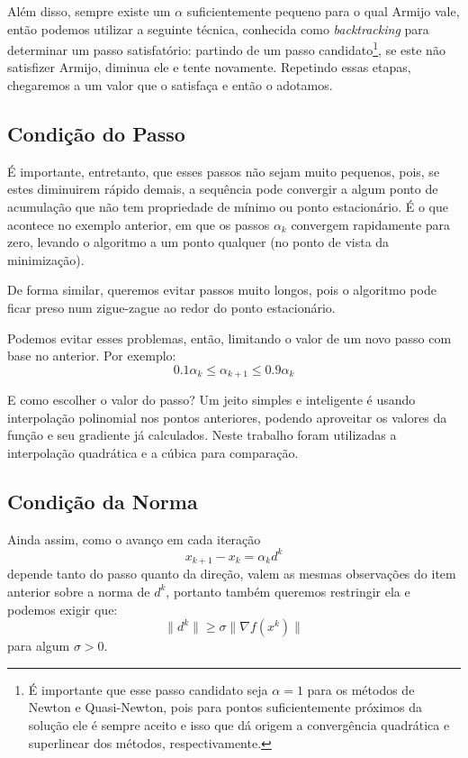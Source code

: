 \documentclass[a4paper,11pt]{article}
\begin{document}
            Além disso, sempre existe um $\alpha$ suficientemente pequeno para o qual Armijo vale, então podemos utilizar
            a seguinte técnica, conhecida como \emph{backtracking} para determinar um passo satisfatório: partindo de um
            passo candidato\footnote{É importante que esse passo candidato seja $\alpha = 1$ para os métodos de Newton e Quasi-Newton, pois para pontos suficientemente próximos da solução ele é sempre aceito e isso que dá origem a convergência quadrática e superlinear dos métodos, respectivamente.}, se este não satisfizer Armijo, diminua ele e tente novamente. Repetindo essas etapas, chegaremos a
            um valor que o satisfaça e então o adotamos.

        \subsection*{Condição do Passo}
            É importante, entretanto, que esses passos não sejam muito pequenos, pois, se estes diminuirem rápido demais, a sequência pode
            convergir a algum ponto de acumulação que não tem propriedade de mínimo ou ponto estacionário. É o que acontece
            no exemplo anterior, em que os passos $\alpha_k$ convergem rapidamente para zero, levando o algoritmo a um ponto
            qualquer (no ponto de vista da minimização).

            De forma similar, queremos evitar passos muito longos, pois o algoritmo pode ficar preso num zigue-zague ao redor do
            ponto estacionário.

            Podemos evitar esses problemas, então, limitando o valor de um novo passo com base no anterior. Por exemplo:
            $$ 0.1\alpha_k \leq \alpha_{k+1} \leq 0.9\alpha_k$$

            E como escolher o valor do passo? Um jeito simples e inteligente é usando interpolação polinomial nos pontos
            anteriores, podendo aproveitar os valores da função e seu gradiente já calculados. Neste trabalho foram utilizadas
            a interpolação quadrática e a cúbica para comparação.

        \subsection*{Condição da Norma}
            Ainda assim, como o avanço em cada iteração
                $$x_{k+1} - x_k = \alpha_k d^k$$
            depende tanto do passo quanto da direção, valem as mesmas observações do item anterior sobre a norma de $d^k$, portanto
            também queremos restringir ela e podemos exigir que:
                $$ \|d^k\| \geq \sigma \|\nabla f(x^k) \|$$
            para algum $\sigma > 0$.
\end{document}
